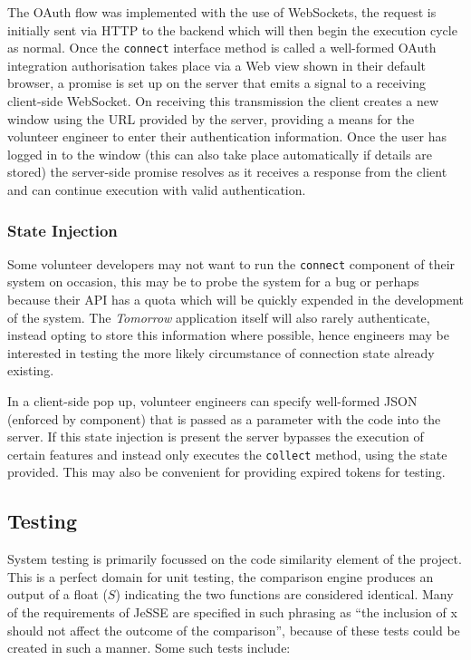 \documentclass[jou,apacite]{apa6}
\begin{document}
The OAuth flow was implemented with the use of WebSockets, the request is initially sent via HTTP to the backend which will then begin the execution cycle as normal. Once the \texttt{connect} interface method is called a well-formed OAuth integration authorisation takes place via a Web view shown in their default browser, a promise is set up on the server that emits a signal to a receiving client-side WebSocket. On receiving this transmission the client creates a new window using the URL provided by the server, providing a means for the volunteer engineer to enter their authentication information. Once the user has logged in to the window (this can also take place automatically if details are stored) the server-side promise resolves as it receives a response from the client and can continue execution with valid authentication.

\subsubsection{State Injection}
Some volunteer developers may not want to run the \texttt{connect} component of their system on occasion, this may be to probe the system for a bug or perhaps because their API has a quota which will be quickly expended in the development of the system. The \textit{Tomorrow} application itself will also rarely authenticate, instead opting to store this information where possible, hence engineers may be interested in testing the more likely circumstance of connection state already existing. 

In a client-side pop up, volunteer engineers can specify well-formed JSON (enforced by component) that is passed as a parameter with the code into the server. If this state injection is present the server bypasses the execution of certain features and instead only executes the \texttt{collect} method, using the state provided. This may also be convenient for providing expired tokens for testing.

\subsection{Testing}
System testing is primarily focussed on the code similarity element of the project. This is a perfect domain for unit testing, the comparison engine produces an output of a float ($S$) indicating the two functions are considered identical. Many of the requirements of JeSSE are specified in such phrasing as “the inclusion of x should not affect the outcome of the comparison”, because of these tests could be created in such a manner. Some such tests include:
\end{document}
